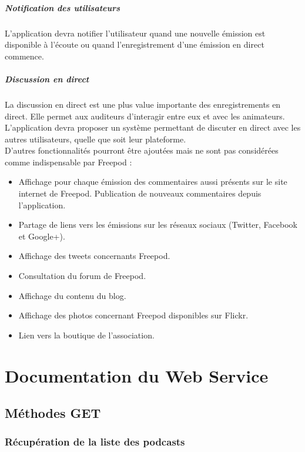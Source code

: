 \documentclass[11pt, french]{report}
\begin{document}
\paragraph{Notification des utilisateurs}
L’application devra notifier l’utilisateur quand une nouvelle émission est disponible à l’écoute ou quand l’enregistrement d’une émission en direct commence.

\paragraph{Discussion en direct}
La discussion en direct est une plus value importante des enregistrements en direct. Elle permet aux auditeurs d'interagir entre eux et avec les animateurs. L’application devra proposer un système permettant de discuter en direct avec les autres utilisateurs, quelle que soit leur plateforme.\\

D’autres fonctionnalités pourront être ajoutées mais ne sont pas considérées comme indispensable par Freepod :
\begin{itemize}
\item Affichage pour chaque émission des commentaires aussi présents sur le site internet de Freepod. Publication de nouveaux commentaires depuis l’application.
\item Partage de liens vers les émissions sur les réseaux sociaux (Twitter, Facebook et Google+).
\item Affichage des tweets concernants Freepod.
\item Consultation du forum de Freepod.
\item Affichage du contenu du blog.
\item Affichage des photos concernant Freepod disponibles sur Flickr.
\item Lien vers la boutique de l’association.
\end{itemize}

\chapter{Documentation du Web Service}

\section*{Méthodes GET}

\subsection*{Récupération de la liste des podcasts}
\end{document}
